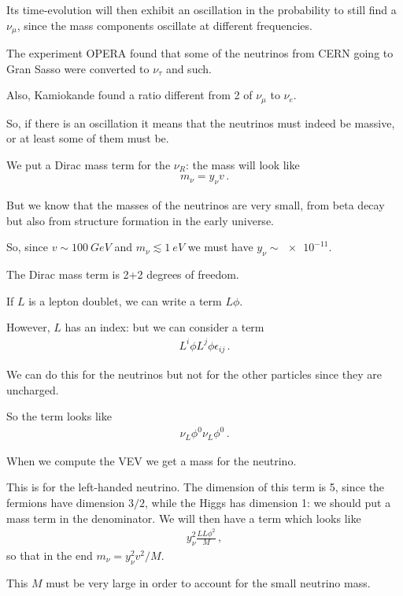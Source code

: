 \documentclass[main.tex]{subfiles}
\begin{document}
Its time-evolution will then exhibit an oscillation in the probability to still find a \(\nu_{\mu }\), since the mass components oscillate at different frequencies.

The experiment OPERA found that some of the neutrinos from CERN going to Gran Sasso were converted to \(\nu_{\tau }\) and such. 

Also, Kamiokande found a ratio different from 2 of \(\nu_{\mu }\) to \(\nu_{e}\).

So, if there is an oscillation it means that the neutrinos must indeed be massive, or at least some of them must be.

We put a Dirac mass term for the \(\nu_{R}\): the mass will look like 
%
\begin{align}
m_{\nu } =  y_{\nu } v
\,.
\end{align}

But we know that the masses of the neutrinos are very small, from beta decay but also from structure formation in the early universe.

So, since \(v \sim \SI{100}{GeV}\) and \(m_{\nu } \lesssim \SI{1}{eV}\) we must have \(y_{\nu } \sim \num{e-11}\).

The Dirac mass term is 2+2 degrees of freedom. 

If \(L\) is a lepton doublet, we can write a term \(L \phi \).

However, \(L\) has an index: but we can consider a term 
%
\begin{align}
L^{i} \phi L^{j} \phi \epsilon_{ij}
\,.
\end{align}

We can do this for the neutrinos but not for the other particles since they are uncharged. 

So the term looks like 
%
\begin{align}
\nu_{L} \phi^{0} \nu_{L} \phi^{0}
\,.
\end{align}

When we compute the VEV we get a mass for the neutrino. 

This is for the left-handed neutrino. The dimension of this term is 5, since the fermions have dimension \(3/2\), while the Higgs has dimension 1: we should put a mass term in the denominator.
We will then have a term which looks like 
%
\begin{align}
y^2_{\nu } \frac{L L \phi^2}{M}
\,,
\end{align}
%
so that in the end \(m_{\nu } = y^2_{\nu } v^2 / M\).

This \(M\) must be very large in order to account for the small neutrino mass.
\end{document}
